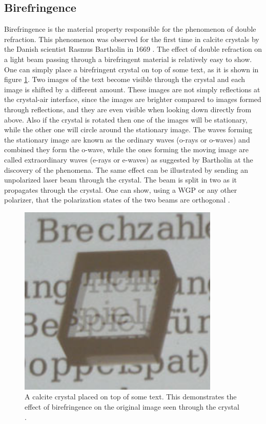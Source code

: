 \subsection{Birefringence}
\label{sec:birefringence}
Birefringence is the material property responsible for the phenomenon of double refraction. This phenomenon was observed for the first time in calcite crystals by the Danish scientist Rasmus Bartholin in 1669 \cite{RasmusBartholin1669ExperimentaDetegitur, Restaino2015PolarizationDevices}. The effect of double refraction on a light beam passing through a birefringent material is relatively easy to show. One can simply place a birefringent crystal on top of some text, as it is shown in figure \ref{fig:3birefringence}. Two images of the text become visible through the crystal and each image is shifted by a different amount. These images are not simply reflections at the crystal-air interface, since the images are brighter compared to images formed through reflections, and they are even visible when looking down directly from above. Also if the crystal is rotated then one of the images will be stationary, while the other one will circle around the stationary image. The waves forming the stationary image are known as the ordinary waves (o-rays or o-waves) and combined they form the o-wave, while the ones forming the moving image are called extraordinary waves (e-rays or e-waves) as suggested by Bartholin at the discovery of the phenomena. The same effect can be illustrated by sending an unpolarized laser beam through the crystal. The beam is split in two as it propagates through the crystal. One can show, using a WGP or any other polarizer, that the polarization states of the two beams are orthogonal \cite{Roth2019Optik}.

\begin{figure}[h]
    \centering
    \includegraphics[scale=0.25]{images/3_chapter03/birefringence.png}
    \caption{A calcite crystal placed on top of some text. This demonstrates the effect of birefringence on the original image seen through the crystal \cite{Roth2019Optik}.}
    \label{fig:3birefringence}
\end{figure}

